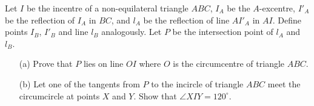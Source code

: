 Let 
$I$
 be the incentre of a non-equilateral triangle 
$ABC$, 
$I_A$
 be the 
$A$-excentre, 
$I'_A$
 be the reflection of 
$I_A$
 in 
$BC$, 
 and 
$l_A$
 be the reflection of line 
$AI'_A$
 in 
$AI$. 
 Define points 
$I_B$, 
$I'_B$
 and line 
$l_B$
 analogously. Let 
$P$
 be the intersection point of 
$l_A$
 and 
$l_B$. 

\begin{itemize}
    \item[(a)] Prove that 
    $P$
    lies on line 
    $OI$
    where 
    $O$
    is the circumcentre of triangle 
    $ABC$. 
    
    \item[(b)] Let one of the tangents from 
    $P$
    to the incircle of triangle 
    $ABC$
    meet the circumcircle at points 
    $X$
    and 
    $Y$. 
    Show that 
    $\angle XIY = 120^{\circ}$. 
\end{itemize}
